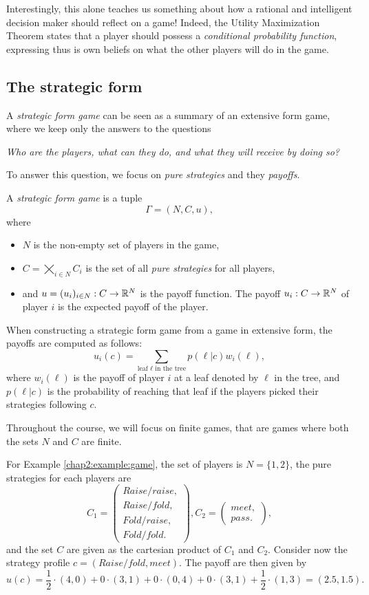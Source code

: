 Interestingly, this alone teaches us something about how a rational and intelligent decision maker should reflect on a game! Indeed, the Utility Maximization Theorem states that a player should possess a \emph{conditional probability function}, expressing thus is own beliefs on what the other players will do in the game.
\subsection{The strategic form}
\label{subsec:StratForm}

A \emph{strategic form game} can be seen as a summary of an extensive form game, where we keep only the answers to the questions
\begin{center}
\textit{Who are the players, what can they do, and what they will receive by doing so?}
\end{center}

To answer this question, we focus on \emph{pure strategies} and they \emph{payoffs}.


\begin{definition}
A \emph{strategic form game} is a tuple
$$ \Gamma = (N, C, u),$$
where
\begin{itemize}
\item $N$ is the non-empty set of players in the game,
\item $C = \bigtimes_{i \in N}C_i$ is the set of all \emph{pure strategies} for all players,
\item and $u = (u_i)_{i \in N} : C \rightarrow \mathbb{R}^N$ is the payoff function.
The payoff $u_i : C \rightarrow \mathbb{R}^N$ of player $i$
is the expected payoff of the player.
\end{itemize}
When constructing a strategic form game from a game in extensive form, the payoffs are computed as follows:
$$u_i(c) = \sum_{\text{leaf $\ell$ in the tree}} p(\ell|c) w_i(\ell), $$
where $w_i(\ell)$ is the payoff of player $i$ at a leaf denoted by $\ell$ in the tree, and $p(\ell|c)$ is the probability of reaching that leaf if the players picked their strategies following $c$.
\end{definition}
Throughout the course, we will focus on finite games, that are games where both the sets $N$ and $C$ are finite.
\begin{example}
For Example \ref{chap2:example:game}, the set of players is $N = \{1,2\}$,
the pure strategies for each players are
 $$C_1 = \begin{pmatrix}
Raise/raise, \\
Raise/fold, \\
Fold/raise, \\
Fold/fold.
\end{pmatrix}, C_2 = \begin{pmatrix}
meet,\\
pass.
\end{pmatrix},$$
and the set $C$ are given as the cartesian product of $C_1$ and $C_2$.
Consider now the strategy profile $c = (Raise/fold, meet)$.
The payoff are then given by
$$u(c) = \frac{1}{2} \cdot (4,0) + 0 \cdot (3,1)+ 0 \cdot (0,4) + 0 \cdot (3,1) + \frac{1}{2} \cdot (1,3) = (2.5,1.5).$$
\end{example}

